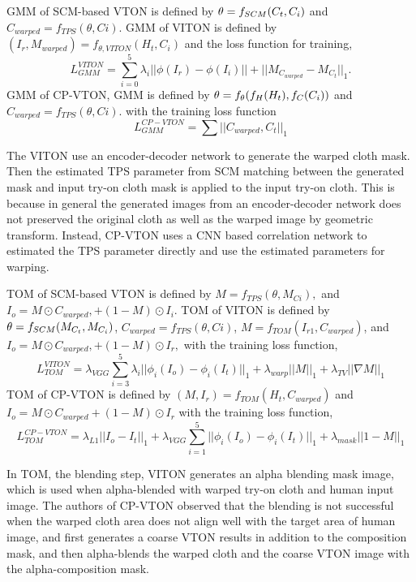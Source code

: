 GMM of SCM-based VTON is defined by  
$
   \bold{\theta} = f_{SCM} (C_t, C_i)
$
and
$
   C_{warped} = f_{TPS}(\theta, Ci)
$.    
GMM of VITON is defined by 
$
   (I_{r}, M_{warped}) = f_{\theta, VITON} (H_t, C_i) 
$
and the loss function for training, 
\[
   L_{GMM}^{VITON} =   \sum_{i=0}^{5} \lambda_i || \phi (I_r) - \phi (I_i)||  + 
   ||M_{C_{warped}} -  M_{C_t}||_1 .
\]
GMM of CP-VTON, GMM is defined by 
$  
   \bold{\theta} = f_{\theta} ( f_H (H_t), f_C(C_i) )
$
and
$
   C_{warped} = f_{TPS}(\theta, Ci).
$    
with the training loss function
\[
   L_{GMM}^{CP-VTON} =  \sum ||C_{warped}, C_t||_1
\]

The VITON use an encoder-decoder network to generate the warped cloth mask. Then the estimated TPS parameter from SCM matching between the generated mask and input try-on cloth mask is applied to the input try-on cloth. This is because in general the generated images from an encoder-decoder network does not preserved the original cloth as well as the warped image by geometric transform. Instead, CP-VTON uses a CNN based correlation network to estimated the TPS parameter directly and use the estimated parameters for warping.   


TOM  of SCM-based VTON  is defined by 
$
   M = f_{TPS}(\theta, M_{Ci}),
$    
and 
$
   I_o = M \odot C_{warped}, + (1-M) \odot I_i 
$.
TOM of VITON is defined by 
$
   \bold{\theta} = f_{SCM} (M_{C_t}, M_{C_i})
$,
$
   C_{warped} = f_{TPS}(\theta, Ci)
$,    
$
 M = f_{TOM} ( I_{r1}, C_{warped} ) 
$, 
and 
$
   I_o = M \odot C_{warped}, + (1-M) \odot I_{r},
$
with the training loss function, 
\[
   L_{TOM}^{VITON} = \lambda_{VGG} \sum_{i=3}^{5} \lambda_i || \phi_i(I_o) - \phi_i(I_t)||_{1}  + 
             \lambda_{warp}  || M ||_{1}  + 
             \lambda_{TV} || \nabla M||_{1}      
\]
TOM of CP-VTON is defined by 
$
 (M, I_r) = f_{TOM} ( H_t, C_{warped} )  
$
and 
$
   I_o = M \odot C_{warped} + (1-M) \odot I_r
$
with the training loss function, 
\[
   L_{TOM}^{CP-VTON} = \lambda_{L1}  || I_o - I_t ||_1  + 
             \lambda_{VGG} \sum_{i=1}^{5} || \phi_i(I_o) - \phi_i(I_t)||_1  + 
             \lambda_{mask} || 1 - M ||_1      
\]


In TOM, the blending step, VITON generates an alpha blending mask image, which is used when alpha-blended with warped try-on cloth and human input image. The authors of CP-VTON observed that the blending is not successful when the warped  cloth area does not align well with the target area of human image, and first generates a coarse VTON results in addition to the composition mask, and then alpha-blends the warped cloth and the coarse VTON image with the alpha-composition mask.       



